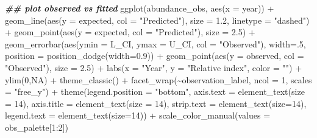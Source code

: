 \documentclass[
]{book}
\newenvironment{Shaded}{\begin{snugshade}}{\end{snugshade}}
\newcommand{\AttributeTok}[1]{\textcolor[rgb]{0.77,0.63,0.00}{#1}}
\newcommand{\ConstantTok}[1]{\textcolor[rgb]{0.00,0.00,0.00}{#1}}
\newcommand{\DecValTok}[1]{\textcolor[rgb]{0.00,0.00,0.81}{#1}}
\newcommand{\DocumentationTok}[1]{\textcolor[rgb]{0.56,0.35,0.01}{\textbf{\textit{#1}}}}
\newcommand{\FloatTok}[1]{\textcolor[rgb]{0.00,0.00,0.81}{#1}}
\newcommand{\FunctionTok}[1]{\textcolor[rgb]{0.00,0.00,0.00}{#1}}
\newcommand{\NormalTok}[1]{#1}
\newcommand{\SpecialCharTok}[1]{\textcolor[rgb]{0.00,0.00,0.00}{#1}}
\newcommand{\StringTok}[1]{\textcolor[rgb]{0.31,0.60,0.02}{#1}}
\begin{document}
\begin{Shaded}
\begin{Highlighting}[]
\DocumentationTok{\#\# plot observed vs fitted}
\FunctionTok{ggplot}\NormalTok{(abundance\_obs, }\FunctionTok{aes}\NormalTok{(}\AttributeTok{x =}\NormalTok{ year)) }\SpecialCharTok{+}
    \FunctionTok{geom\_line}\NormalTok{(}\FunctionTok{aes}\NormalTok{(}\AttributeTok{y =}\NormalTok{ expected, }\AttributeTok{col =} \StringTok{"Predicted"}\NormalTok{), }\AttributeTok{size =} \FloatTok{1.2}\NormalTok{, }
              \AttributeTok{linetype =} \StringTok{"dashed"}\NormalTok{) }\SpecialCharTok{+}
    \FunctionTok{geom\_point}\NormalTok{(}\FunctionTok{aes}\NormalTok{(}\AttributeTok{y =}\NormalTok{ expected, }\AttributeTok{col =} \StringTok{"Predicted"}\NormalTok{), }\AttributeTok{size =} \FloatTok{2.5}\NormalTok{) }\SpecialCharTok{+}
    \FunctionTok{geom\_errorbar}\NormalTok{(}\FunctionTok{aes}\NormalTok{(}\AttributeTok{ymin =}\NormalTok{ L\_CI, }\AttributeTok{ymax =}\NormalTok{ U\_CI, }\AttributeTok{col =} \StringTok{"Observed"}\NormalTok{), }
                  \AttributeTok{width=}\NormalTok{.}\DecValTok{5}\NormalTok{, }\AttributeTok{position =} \FunctionTok{position\_dodge}\NormalTok{(}\AttributeTok{width=}\FloatTok{0.9}\NormalTok{)) }\SpecialCharTok{+}
    \FunctionTok{geom\_point}\NormalTok{(}\FunctionTok{aes}\NormalTok{(}\AttributeTok{y =}\NormalTok{ observed, }\AttributeTok{col =} \StringTok{"Observed"}\NormalTok{), }\AttributeTok{size =} \FloatTok{2.5}\NormalTok{) }\SpecialCharTok{+}
    \FunctionTok{labs}\NormalTok{(}\AttributeTok{x =} \StringTok{"Year"}\NormalTok{, }\AttributeTok{y =} \StringTok{"Relative index"}\NormalTok{, }\AttributeTok{color =} \StringTok{""}\NormalTok{) }\SpecialCharTok{+}
    \FunctionTok{ylim}\NormalTok{(}\DecValTok{0}\NormalTok{,}\ConstantTok{NA}\NormalTok{) }\SpecialCharTok{+}
    \FunctionTok{theme\_classic}\NormalTok{() }\SpecialCharTok{+}
    \FunctionTok{facet\_wrap}\NormalTok{(}\SpecialCharTok{\textasciitilde{}}\NormalTok{observation\_label, }\AttributeTok{ncol =} \DecValTok{1}\NormalTok{, }\AttributeTok{scales =} \StringTok{"free\_y"}\NormalTok{) }\SpecialCharTok{+}
    \FunctionTok{theme}\NormalTok{(}\AttributeTok{legend.position =} \StringTok{"bottom"}\NormalTok{, }
          \AttributeTok{axis.text =} \FunctionTok{element\_text}\NormalTok{(}\AttributeTok{size =} \DecValTok{14}\NormalTok{), }
          \AttributeTok{axis.title =} \FunctionTok{element\_text}\NormalTok{(}\AttributeTok{size =} \DecValTok{14}\NormalTok{),}
          \AttributeTok{strip.text =} \FunctionTok{element\_text}\NormalTok{(}\AttributeTok{size=}\DecValTok{14}\NormalTok{),}
          \AttributeTok{legend.text =} \FunctionTok{element\_text}\NormalTok{(}\AttributeTok{size=}\DecValTok{14}\NormalTok{)) }\SpecialCharTok{+}
    \FunctionTok{scale\_color\_manual}\NormalTok{(}\AttributeTok{values =}\NormalTok{ obs\_palette[}\DecValTok{1}\SpecialCharTok{:}\DecValTok{2}\NormalTok{])}
\end{Highlighting}
\end{Shaded}
\end{document}

